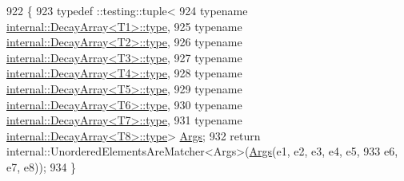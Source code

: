 {\begin{DoxyCode}
922                                                             \{
923   typedef ::testing::tuple<
924       \textcolor{keyword}{typename} \hyperlink{namespaceupload_a4fc56f0dd6613be15c3c4dc3af3619ce}{internal::DecayArray<T1>::type},
925       \textcolor{keyword}{typename} \hyperlink{namespaceupload_a4fc56f0dd6613be15c3c4dc3af3619ce}{internal::DecayArray<T2>::type},
926       \textcolor{keyword}{typename} \hyperlink{namespaceupload_a4fc56f0dd6613be15c3c4dc3af3619ce}{internal::DecayArray<T3>::type},
927       \textcolor{keyword}{typename} \hyperlink{namespaceupload_a4fc56f0dd6613be15c3c4dc3af3619ce}{internal::DecayArray<T4>::type},
928       \textcolor{keyword}{typename} \hyperlink{namespaceupload_a4fc56f0dd6613be15c3c4dc3af3619ce}{internal::DecayArray<T5>::type},
929       \textcolor{keyword}{typename} \hyperlink{namespaceupload_a4fc56f0dd6613be15c3c4dc3af3619ce}{internal::DecayArray<T6>::type},
930       \textcolor{keyword}{typename} \hyperlink{namespaceupload_a4fc56f0dd6613be15c3c4dc3af3619ce}{internal::DecayArray<T7>::type},
931       \textcolor{keyword}{typename} \hyperlink{namespaceupload_a4fc56f0dd6613be15c3c4dc3af3619ce}{internal::DecayArray<T8>::type}> 
      \hyperlink{namespacetesting_a09ac462e8d6ed468cbfaa9c767aee0aa}{Args};
932   \textcolor{keywordflow}{return} internal::UnorderedElementsAreMatcher<Args>(\hyperlink{namespacetesting_a09ac462e8d6ed468cbfaa9c767aee0aa}{Args}(e1, e2, e3, e4, e5,
933       e6, e7, e8));
934 \}
\end{DoxyCode}
}

